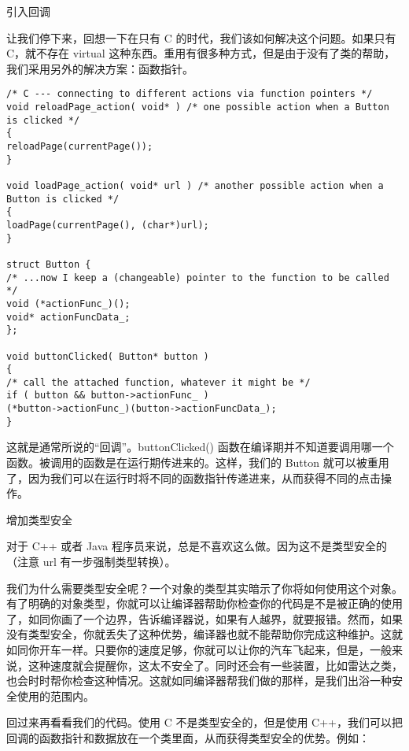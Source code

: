 引入回调

让我们停下来，回想一下在只有 C 的时代，我们该如何解决这个问题。如果只有 C，就不存在 virtual 这种东西。重用有很多种方式，但是由于没有了类的帮助，我们采用另外的解决方案：函数指针。
\begin{lstlisting}
/* C --- connecting to different actions via function pointers */
void reloadPage_action( void* ) /* one possible action when a Button is clicked */
{
reloadPage(currentPage());
}

void loadPage_action( void* url ) /* another possible action when a Button is clicked */
{
loadPage(currentPage(), (char*)url);
}

struct Button {
/* ...now I keep a (changeable) pointer to the function to be called */
void (*actionFunc_)();
void* actionFuncData_;
};

void buttonClicked( Button* button )
{
/* call the attached function, whatever it might be */
if ( button && button->actionFunc_ )
(*button->actionFunc_)(button->actionFuncData_);
}
\end{lstlisting}

这就是通常所说的“回调”。buttonClicked() 函数在编译期并不知道要调用哪一个函数。被调用的函数是在运行期传进来的。这样，我们的 Button 就可以被重用了，因为我们可以在运行时将不同的函数指针传递进来，从而获得不同的点击操作。

增加类型安全

对于 C++ 或者 Java 程序员来说，总是不喜欢这么做。因为这不是类型安全的（注意 url 有一步强制类型转换）。

我们为什么需要类型安全呢？一个对象的类型其实暗示了你将如何使用这个对象。有了明确的对象类型，你就可以让编译器帮助你检查你的代码是不是被正确的使用了，如同你画了一个边界，告诉编译器说，如果有人越界，就要报错。然而，如果没有类型安全，你就丢失了这种优势，编译器也就不能帮助你完成这种维护。这就如同你开车一样。只要你的速度足够，你就可以让你的汽车飞起来，但是，一般来说，这种速度就会提醒你，这太不安全了。同时还会有一些装置，比如雷达之类，也会时时帮你检查这种情况。这就如同编译器帮我们做的那样，是我们出浴一种安全使用的范围内。

回过来再看看我们的代码。使用 C 不是类型安全的，但是使用 C++，我们可以把回调的函数指针和数据放在一个类里面，从而获得类型安全的优势。例如：


